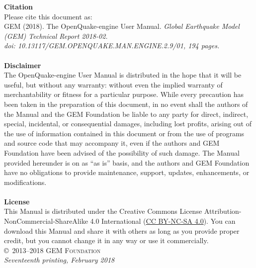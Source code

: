 \documentclass[11pt,fleqn]{book} %
\begin{document}
\noindent
   {\textbf{Citation}} \hfill \\
   Please cite this document as: \hfill \\
   GEM (2018). The OpenQuake-engine User Manual.
   \textit{Global Earthquake Model (GEM) Technical Report 2018-02.\\
   doi: 10.13117/GEM.OPENQUAKE.MAN.ENGINE.2.9/01, 194 pages.} \hfill \\
\noindent \hfill\\
\noindent
   {\bf{Disclaimer}} \hfill \\
   The OpenQuake-engine User Manual is distributed in the hope that it will be
   useful, but without any warranty: without even the implied warranty of
   merchantability or fitness for a particular purpose. While every precaution
   has been taken in the preparation of this document, in no event shall the
   authors of the Manual and the GEM Foundation be liable to any party for
   direct, indirect, special, incidental, or consequential damages, including
   lost profits, arising out of the use of information contained in this
   document or from the use of programs and source code that may accompany it,
   even if the authors and GEM Foundation have been advised of the possibility
   of such damage. The Manual provided hereunder is on as ``as is'' basis, and
   the  authors and GEM Foundation have no obligations to provide maintenance,
   support, updates, enhancements, or modifications. \hfill \\
\noindent \hfill\\
\noindent
   {\bf{License}} \hfill \\
   This Manual is distributed under the Creative Commons License  Attribution-
   NonCommercial-ShareAlike 4.0 International
   (\href{http://creativecommons.org/licenses/by-nc-sa/4.0/} {CC BY-NC-SA
   4.0}). You can download this Manual and share it with others as long as you
   provide proper credit, but you cannot change it in any way or use it
   commercially.\hfill \\

\noindent \copyright\ \textsc{2013--2018 GEM Foundation}\\
\noindent \textit{Seventeenth printing, February 2018} %


\pagestyle{empty} %
\tableofcontents %
\cleardoublepage %
\pagestyle{fancy} %
\end{document}
